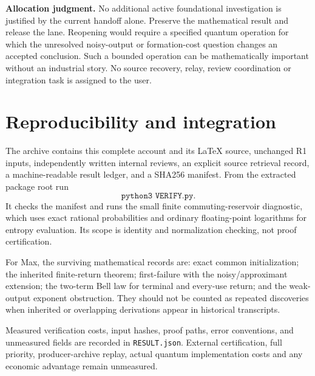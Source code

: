 \documentclass[11pt,a4paper]{article}
\numberwithin{equation}{section}
\theoremstyle{remark}
\begin{document}
\textbf{Allocation judgment.} No additional active foundational
investigation is justified by the current handoff alone. Preserve the
mathematical result and release the lane. Reopening would require a
specified quantum operation for which the unresolved noisy-output or
formation-cost question changes an accepted conclusion. Such a bounded
operation can be mathematically important without an industrial story.
No source recovery, relay, review coordination or integration task is
assigned to the user.

\appendix
\section{Reproducibility and integration}
The archive contains this complete account and its LaTeX source, unchanged
R1 inputs, independently written internal reviews, an explicit source
retrieval record, a machine-readable result ledger, and a SHA256 manifest.
From the extracted package root run
\[
 \texttt{python3 VERIFY.py}.
\]
It checks the manifest and runs the small finite commuting-reservoir
diagnostic, which uses exact rational probabilities and ordinary
floating-point logarithms for entropy evaluation. Its scope is identity
and normalization checking, not proof certification.

For Max, the surviving mathematical records are: exact common
initialization; the inherited finite-return theorem; first-failure with
the noisy/approximant extension; the two-term Bell law for terminal and
every-use return; and the weak-output exponent obstruction. They should
not be counted as repeated discoveries when inherited or overlapping
derivations appear in historical transcripts.

Measured verification costs, input hashes, proof paths, error conventions,
and unmeasured fields are recorded in \texttt{RESULT.json}.
External certification, full priority, producer-archive replay, actual
quantum implementation costs and any economic advantage remain unmeasured.
\end{document}
